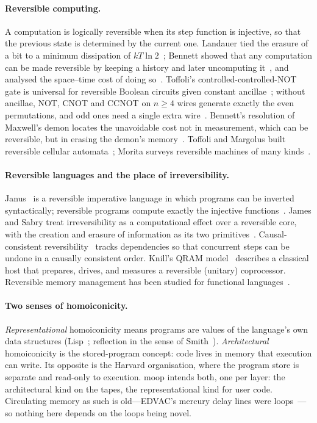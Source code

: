 \documentclass[11pt]{article}
\theoremstyle{definition}
\theoremstyle{remark}
\newcommand{\moop}{\textsf{moop}}
\begin{document}
\paragraph{Reversible computing.}
A computation is logically reversible when its step function is
injective, so that the previous state is determined by the current one.
Landauer tied the erasure of a bit to a minimum dissipation of
$kT\ln 2$~\cite{landauer1961}; Bennett showed that any computation can be
made reversible by keeping a history and later uncomputing
it~\cite{bennett1973}, and analysed the space--time cost of doing
so~\cite{bennett1989}. Toffoli's controlled-controlled-NOT gate is
universal for reversible Boolean circuits given constant
ancillae~\cite{toffoli1980}; without ancillae, NOT, CNOT and CCNOT on
$n\ge4$ wires generate exactly the even permutations, and odd ones need a
single extra wire~\cite{shende2003}. Bennett's resolution of Maxwell's
demon locates the unavoidable cost not in measurement, which can be
reversible, but in erasing the demon's memory~\cite{bennett1982}. Toffoli
and Margolus built reversible cellular automata~\cite{toffoli1987}; Morita
surveys reversible machines of many kinds~\cite{morita2017}.

\paragraph{Reversible languages and the place of irreversibility.}
Janus~\cite{lutz1982,yokoyama2007} is a reversible imperative language in
which programs can be inverted syntactically; reversible programs compute
exactly the injective functions~\cite{axelsen2011}. James and Sabry treat
irreversibility as a computational effect over a reversible core, with
the creation and erasure of information as its two
primitives~\cite{james2012}. Causal-consistent
reversibility~\cite{danos2004} tracks dependencies so that concurrent
steps can be undone in a causally consistent order. Knill's QRAM
model~\cite{knill1996} describes a classical host that prepares, drives,
and measures a reversible (unitary) coprocessor. Reversible memory
management has been studied for functional languages~\cite{mogensen2015}.

\paragraph{Two senses of homoiconicity.}
\emph{Representational} homoiconicity means programs are values of the
language's own data structures (Lisp~\cite{mccarthy1960}; reflection in
the sense of Smith~\cite{smith1984}). \emph{Architectural}
homoiconicity is the stored-program concept: code lives in memory that
execution can write. Its opposite is the Harvard organisation, where
the program store is separate and read-only to execution. \moop{} intends both, one per
layer: the architectural kind on the tapes, the representational kind
for user code. Circulating memory as such is old---EDVAC's mercury delay
lines were loops~\cite{vonneumann1945}---so nothing here depends on the
loops being novel.
\end{document}
